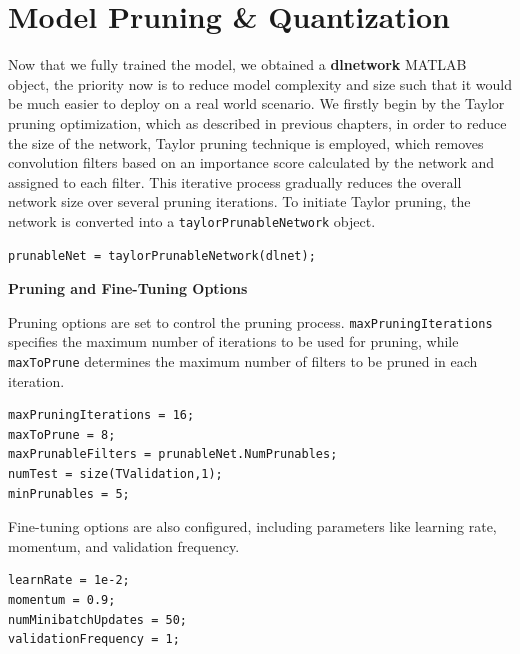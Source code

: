 \documentclass[a4paper]{report}
\begin{document}
{\section{Model Pruning \& Quantization}
Now that we fully trained the model, we obtained a \textbf{dlnetwork} MATLAB object, the priority now is to reduce model complexity and size such that it would be much easier to deploy on a real world scenario. We firstly begin by the Taylor pruning optimization, which as described in previous chapters, in order to reduce the size of the network, Taylor pruning technique is employed, which removes convolution filters based on an importance score calculated by the network and assigned to each filter. This iterative process gradually reduces the overall network size over several pruning iterations. To initiate Taylor pruning, the network is converted into a \texttt{taylorPrunableNetwork} object.

\begin{center}
\begin{tcolorbox}[breakable, enhanced, boxsep=10pt]
\begin{verbatim}
prunableNet = taylorPrunableNetwork(dlnet);
\end{verbatim}
\end{tcolorbox}
\end{center}

\textbf{Pruning and Fine-Tuning Options}

Pruning options are set to control the pruning process. \texttt{maxPruningIterations} specifies the maximum number of iterations to be used for pruning, while \texttt{maxToPrune} determines the maximum number of filters to be pruned in each iteration. 

\begin{center}
\begin{tcolorbox}[breakable, enhanced, boxsep=10pt]
\begin{verbatim}
maxPruningIterations = 16;
maxToPrune = 8;
maxPrunableFilters = prunableNet.NumPrunables;
numTest = size(TValidation,1);
minPrunables = 5;
\end{verbatim}
\end{tcolorbox}
\end{center}

Fine-tuning options are also configured, including parameters like learning rate, momentum, and validation frequency.

\begin{center}
\begin{tcolorbox}[breakable, enhanced, boxsep=10pt]
\begin{verbatim}
learnRate = 1e-2;
momentum = 0.9;
numMinibatchUpdates = 50;
validationFrequency = 1;
\end{verbatim}
\end{tcolorbox}
\end{center}

}
\end{document}
